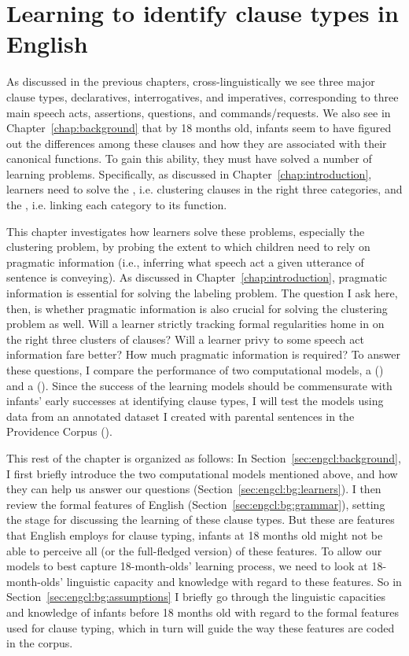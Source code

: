 \chapter{Learning to identify clause types in English}
\label{chap:eng-cl}


As discussed in the previous chapters, cross-linguistically we see three major clause types, declaratives, interrogatives, and imperatives, corresponding to three main speech acts, assertions, questions, and commands/requests. We also see in Chapter~\ref{chap:background} that by 18 months old, infants seem to have figured out the differences among these clauses and how they are associated with their canonical functions.  To gain this ability, they must have solved a number of learning problems. Specifically, as discussed in Chapter~\ref{chap:introduction}, learners need to solve the , i.e. clustering clauses in the right three categories, and the , i.e. linking each category to its function. 

This chapter investigates how learners solve these problems, especially the clustering problem, by probing the extent to which children need to rely on pragmatic information (i.e., inferring what speech act a given utterance of sentence is conveying). As discussed in Chapter~\ref{chap:introduction}, pragmatic information is essential for solving the labeling problem. The question I ask here, then, is whether pragmatic information is also crucial for solving the clustering problem as well. Will a learner strictly tracking formal regularities home in on the right three clusters of clauses? Will a learner privy to some speech act information fare better? How much pragmatic information is required? To answer these questions, I compare the performance of two computational models, a \tbf{\distlearner{}} (\dlearnerabbr{}) and a \tbf{\praglearner{}} (\plearnerabbr{}). Since the success of the learning models should be commensurate with infants' early successes at identifying clause types, I will test the models using data from an annotated dataset I created with parental sentences in the Providence Corpus (\cite{ProvidenceCorpus}).

This rest of the chapter is organized as follows: 
In Section~\ref{sec:engcl:background}, I first briefly introduce the two computational models mentioned above, and how they can help us answer our questions (Section~\ref{sec:engcl:bg:learners}). I then review the formal features of English \diis{} (Section~\ref{sec:engcl:bg:grammar}), setting the stage for discussing the learning of these clause types. But these are features that English employs for clause typing, infants at 18 months old might not be able to perceive all (or the full-fledged version) of these features. To allow our models to best capture 18-month-olds' learning process, we need to look at 18-month-olds' linguistic capacity and knowledge with regard to these features. So in Section~\ref{sec:engcl:bg:assumptions} I briefly go through the linguistic capacities and knowledge of infants before 18 months old with regard to the formal features used for clause typing, which in turn will guide the way these features are coded in the corpus. 

